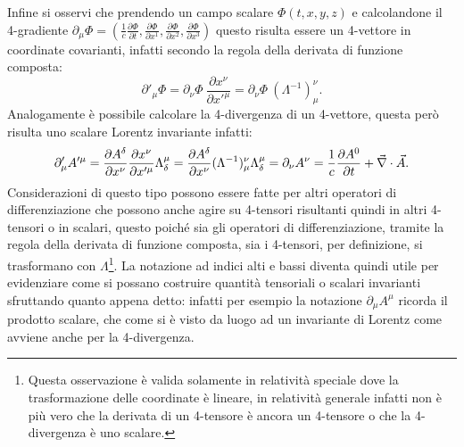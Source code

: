 Infine si osservi che prendendo un campo scalare $\Phi(t,x,y,z)$ e calcolandone il 4-gradiente $\partial_\mu\Phi=(\frac{1}{c}\frac{\partial\Phi}{\partial t},\frac{\partial\Phi}{\partial x^1},\frac{\partial\Phi}{\partial x^2},\frac{\partial\Phi}{\partial x^3})$ questo risulta essere un 4-vettore in coordinate covarianti, infatti secondo la regola della derivata di funzione composta:
\begin{equation*}
    \partial'_\mu\Phi=\partial_\nu\Phi\ \frac{\partial x^\nu}{\partial x'^\mu}=\partial_\nu\Phi\ (\Lambda^{-1})_\mu^\nu.
\end{equation*}
Analogamente è possibile calcolare la 4-divergenza di un 4-vettore, questa però risulta uno scalare Lorentz invariante infatti:
\begin{equation*}
    \partial'_\mu A'^\mu=\frac{\partial A^\delta}{\partial x^\nu} \frac{\partial x^\nu}{\partial x'^\mu}\Lambda^\mu_\delta=\frac{\partial A^\delta}{\partial x^\nu}(\Lambda^{-1})_\mu^\nu \Lambda^\mu_\delta=\partial_\nu A^\nu=\frac{1}{c}\frac{\partial A^0}{\partial t}+\vec{\nabla}\cdot \vec{A}.
\end{equation*} 
Considerazioni di questo tipo possono essere fatte per altri operatori di differenziazione che possono anche agire su 4-tensori risultanti quindi in altri 4-tensori o in scalari, questo poiché sia gli operatori di differenziazione, tramite la regola della derivata di funzione composta, sia i 4-tensori, per definizione, si trasformano con $\Lambda$\footnote{Questa osservazione è valida solamente in relatività speciale dove la trasformazione delle coordinate è lineare, in relatività generale infatti non è più vero che la derivata di un 4-tensore è ancora un 4-tensore o che la 4-divergenza è uno scalare.}. La notazione ad indici alti e bassi diventa quindi utile per evidenziare come si possano costruire quantità tensoriali o scalari invarianti sfruttando quanto appena detto: infatti per esempio la notazione $\partial_\mu A^\mu$ ricorda il prodotto scalare, che come si è visto da luogo ad un invariante di Lorentz come avviene anche per la 4-divergenza.\\
